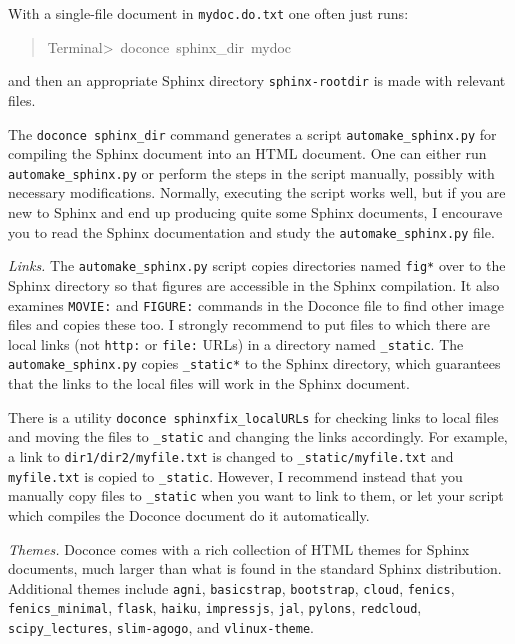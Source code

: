 \documentclass[a4paper]{article}
\begin{document}
With a single-file document in \texttt{mydoc.do.txt} one often just runs:
%
\begin{quote}{\ttfamily \raggedright \noindent
Terminal>~doconce~sphinx\_dir~mydoc
}
\end{quote}

and then an appropriate Sphinx directory \texttt{sphinx-rootdir} is made with
relevant files.

The \texttt{doconce sphinx\_dir} command generates a script
\texttt{automake\_sphinx.py} for compiling the Sphinx document into an HTML
document.  One can either run \texttt{automake\_sphinx.py} or perform the
steps in the script manually, possibly with necessary modifications.
Normally, executing the script works well, but if you are new
to Sphinx and end up producing quite some Sphinx documents, I encourave
you to read the Sphinx documentation and study the \texttt{automake\_sphinx.py}
file.

\emph{Links.} The \texttt{automake\_sphinx.py} script copies directories named \texttt{fig*}
over to the Sphinx directory so that figures are accessible
in the Sphinx compilation.  It also examines \texttt{MOVIE:} and \texttt{FIGURE:}
commands in the Doconce file to find other image files and copies
these too. I strongly recommend to put files
to which there are local links (not \texttt{http:} or \texttt{file:} URLs) in
a directory named \texttt{\_static}. The \texttt{automake\_sphinx.py} copies
\texttt{\_static*} to the Sphinx directory, which guarantees that the links
to the local files will work in the Sphinx document.

There is a utility \texttt{doconce sphinxfix\_localURLs} for checking links to
local files and moving the files to \texttt{\_static} and changing the links
accordingly. For example, a link to \texttt{dir1/dir2/myfile.txt} is changed
to \texttt{\_static/myfile.txt} and \texttt{myfile.txt} is copied to \texttt{\_static}.
However, I recommend instead that you manually copy
files to \texttt{\_static} when you want to link to them, or let your
script which compiles the Doconce document do it automatically.

\emph{Themes.} Doconce comes with a rich collection of HTML themes for Sphinx documents,
much larger than what is found in the standard Sphinx distribution.
Additional themes include
\texttt{agni},
\texttt{basicstrap},
\texttt{bootstrap},
\texttt{cloud},
\texttt{fenics},
\texttt{fenics\_minimal},
\texttt{flask},
\texttt{haiku},
\texttt{impressjs},
\texttt{jal},
\texttt{pylons},
\texttt{redcloud},
\texttt{scipy\_lectures},
\texttt{slim-agogo}, and
\texttt{vlinux-theme}.
\end{document}
